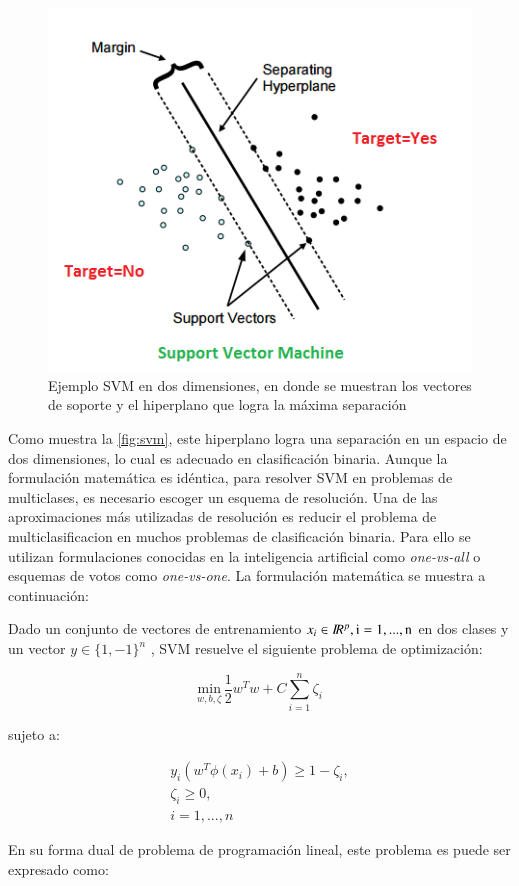 \begin{figure}[ht!]
\centering
\includegraphics[width=.6\textwidth]{figures/SVM-Planes.png}
\caption[Support Vector Machines]{Ejemplo SVM en dos dimensiones, en donde se muestran los vectores de soporte y el hiperplano que logra la máxima separación}
\label{fig:svm}
\end{figure}

Como muestra la \autoref{fig:svm}, este hiperplano logra una separación en un espacio de dos dimensiones, lo cual es adecuado en clasificación binaria. Aunque la formulación matemática es idéntica, para resolver SVM en problemas de multiclases, es necesario escoger un esquema de resolución. Una de las aproximaciones más utilizadas de resolución es reducir el problema de multiclasificacion en muchos problemas de clasificación binaria. Para ello se utilizan formulaciones conocidas en la inteligencia artificial como \textit{one-vs-all} o esquemas de votos como \textit{one-vs-one}. La formulación matemática se muestra a continuación:

Dado un conjunto de vectores de entrenamiento $x_{i} \in I\!R ^{p}, \rm i = 1, ..., n$ en dos clases y un vector $ y  \in \{1, -1\}^{n}$ , SVM resuelve el siguiente problema de optimización:

\begin{equation} \underset{w, b, \zeta}{\mathrm{min}} \, \frac{1}{2} w^{T}w + C
\sum_{i=1}^{n} \zeta_{i} 
\end{equation}

sujeto a: 

\begin{align}
y_{i} ( w^{T} \phi(x_{i}) + b) \geq  1 - \zeta_{i}, \\ 
\zeta_{i} \geq 0, \\
i = 1, ... , n
\end{align} 

En su forma dual de problema de programación lineal, este problema es puede ser expresado como:

